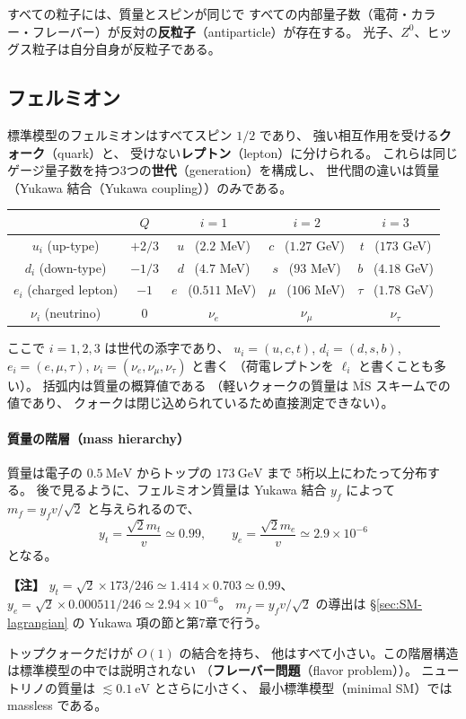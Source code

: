 \documentclass[uplatex,dvipdfmx,a4paper,11pt,openany]{jsbook}
\newcommand{\term}[2]{\textbf{#1}（#2）}
\newcommand{\en}[1]{（#1）}
\newenvironment{note}{\vspace{1ex}\par\footnotesize\noindent\textbf{【注】}}{\par\vspace{1ex}}
\numberwithin{equation}{chapter}
\theoremstyle{definition}
\theoremstyle{plain}
\theoremstyle{remark}
\begin{document}
すべての粒子には、質量とスピンが同じで
すべての内部量子数（電荷・カラー・フレーバー）が反対の\term{反粒子}{antiparticle}が存在する。
光子、$Z^0$、ヒッグス粒子は自分自身が反粒子である。
\subsection{フェルミオン}
標準模型のフェルミオンはすべてスピン $1/2$ であり、
強い相互作用を受ける\term{クォーク}{quark}と、
受けない\term{レプトン}{lepton}に分けられる。
これらは同じゲージ量子数を持つ3つの\term{世代}{generation}を構成し、
世代間の違いは質量（Yukawa 結合\en{Yukawa coupling}）のみである。
\begin{center}
\renewcommand{\arraystretch}{1.3}
\begin{tabular}{ccccc}
\toprule
 & $Q$ & $i=1$ & $i=2$ & $i=3$\\
\midrule
$u_i$ (up-type) & $+2/3$ & $u$ \ ($2.2$ MeV) & $c$ \ ($1.27$ GeV) & $t$ \ ($173$ GeV)\\
$d_i$ (down-type) & $-1/3$ & $d$ \ ($4.7$ MeV) & $s$ \ ($93$ MeV) & $b$ \ ($4.18$ GeV)\\
\midrule
$e_i$ (charged lepton) & $-1$ & $e$ \ ($0.511$ MeV) & $\mu$ \ ($106$ MeV) & $\tau$ \ ($1.78$ GeV)\\
$\nu_i$ (neutrino) & $0$ & $\nu_e$ & $\nu_\mu$ & $\nu_\tau$\\
\bottomrule
\end{tabular}
\end{center}
ここで $i=1,2,3$ は世代の添字であり、
$u_i=(u,c,t)$, $d_i=(d,s,b)$, $e_i=(e,\mu,\tau)$, $\nu_i=(\nu_e,\nu_\mu,\nu_\tau)$ と書く
（荷電レプトンを $\ell_i$ と書くことも多い）。
括弧内は質量の概算値である
（軽いクォークの質量は $\overline{\mathrm{MS}}$ スキームでの値であり、
クォークは閉じ込められているため直接測定できない）。
\paragraph{質量の階層（mass hierarchy）}
質量は電子の $0.5\ \mathrm{MeV}$ からトップの $173\ \mathrm{GeV}$ まで
5桁以上にわたって分布する。
後で見るように、フェルミオン質量は Yukawa 結合 $y_f$ によって
$m_f=y_fv/\sqrt2$ と与えられるので、
\begin{equation}
y_t=\frac{\sqrt2m_t}{v}\simeq0.99,
\qquad
y_e=\frac{\sqrt2m_e}{v}\simeq2.9\times10^{-6}
\end{equation}
となる。
\begin{note}
$y_t=\sqrt2\times173/246\simeq1.414\times0.703\simeq0.99$、
$y_e=\sqrt2\times0.000511/246\simeq2.94\times10^{-6}$。
$m_f=y_fv/\sqrt2$ の導出は \S\ref{sec:SM-lagrangian} の Yukawa 項の節と第7章で行う。
\end{note}
トップクォークだけが $O(1)$ の結合を持ち、
他はすべて小さい。この階層構造は標準模型の中では説明されない
（\term{フレーバー問題}{flavor problem}）。
ニュートリノの質量は $\lesssim0.1\ \mathrm{eV}$ とさらに小さく、
最小標準模型\en{minimal SM}では massless である。
\end{document}
